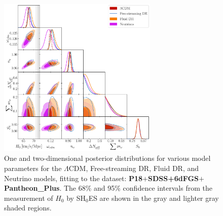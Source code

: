 \documentclass[aps,prd,twocolumn,notitlepage,
superscriptaddress,
nofootinbib,floatfix]{revtex4-2}
\newcommand{\planck}{\textbf{P18}}
\newcommand{\boss}{$\mathbf{+}$\textbf{SDSS+6dFGS}}
\newcommand{\pantheon}{$\mathbf{+}${\bf Pantheon\_Plus}}
\begin{document}
\begin{widetext}
\begin{figure}[H]
\centering
    \includegraphics[width=0.68\textwidth]{figures_21_4/all_bPp.pdf}
    \caption{One and two-dimensional posterior distributions for various model parameters for the $\Lambda$CDM, Free-streaming DR, Fluid DR, and Neutrino models, fitting to the dataset: \planck\boss\pantheon. The 68\% and 95\% confidence intervals from the measurement of $H_0$ by SH$_0$ES are shown in the gray and lighter gray shaded regions.}
\end{figure}


\end{widetext}
\end{document}
